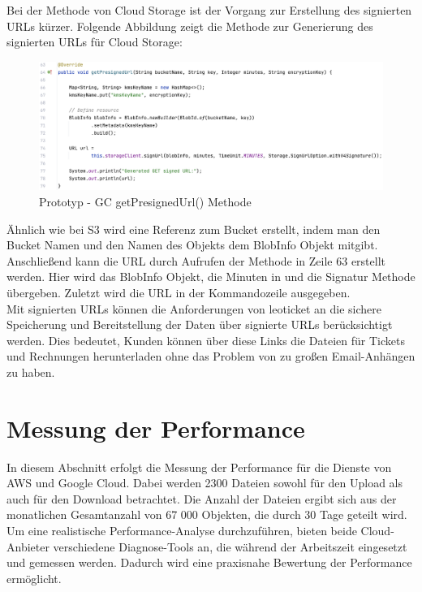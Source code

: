 \newpage

Bei der Methode von Cloud Storage ist der Vorgang zur Erstellung des signierten URLs kürzer. Folgende Abbildung zeigt die Methode zur Generierung des signierten URLs für Cloud Storage:

\begin{figure}[h]
	\centering
	\includegraphics[width=12cm,keepaspectratio]{Pictures/GCgetSignedUrl.png}
	\caption{Prototyp - GC getPresignedUrl() Methode} 
\end{figure}

Ähnlich wie bei S3 wird eine Referenz zum Bucket erstellt, indem man den Bucket Namen und den Namen des Objekts dem BlobInfo Objekt mitgibt. Anschließend kann die URL durch Aufrufen der Methode in Zeile 63 erstellt werden. Hier wird das BlobInfo Objekt, die Minuten in und die Signatur Methode übergeben. Zuletzt wird die URL in der Kommandozeile ausgegeben.\\

Mit signierten URLs können die Anforderungen von leoticket an die sichere Speicherung und Bereitstellung der Daten über signierte URLs berücksichtigt werden. Dies bedeutet, Kunden können über diese Links die Dateien für Tickets und Rechnungen herunterladen ohne das Problem von zu großen Email-Anhängen zu haben.\\

\newpage

\section{Messung der Performance}

In diesem Abschnitt erfolgt die Messung der Performance für die Dienste von AWS und Google Cloud. Dabei werden 2300 Dateien sowohl für den Upload als auch für den Download betrachtet. Die Anzahl der Dateien ergibt sich aus der monatlichen Gesamtanzahl von 67 000 Objekten, die durch 30 Tage geteilt wird. Um eine realistische Performance-Analyse durchzuführen, bieten beide Cloud-Anbieter verschiedene Diagnose-Tools an, die während der Arbeitszeit eingesetzt und gemessen werden. Dadurch wird eine praxisnahe Bewertung der Performance ermöglicht.\\

